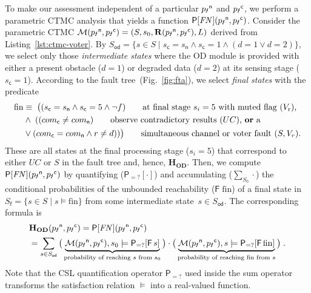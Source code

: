 \documentclass[runningheads,a4paper]{llncs}
\begin{document}
To make our assessment independent of a particular ${p_\text{\Lightning}}^\mathsf{n}$ and
${p_\text{\Lightning}}^\mathsf{c}$, we perform a parametric CTMC analysis that yields a
function $\mathsf{P}[\mathit{FN}]({p_\text{\Lightning}}^\mathsf{n},{p_\text{\Lightning}}^\mathsf{c})$.
Consider the parametric CTMC
$\mathcal{M}({p_\text{\Lightning}}^\mathsf{n},{p_\text{\Lightning}}^\mathsf{c}) =
(S,s_0,\mathbf{R}({p_\text{\Lightning}}^\mathsf{n},{p_\text{\Lightning}}^\mathsf{c}),L)$ derived from
Listing~\ref{lst:ctmc-voter}.
By
$S_{\mathsf{od}}=\{s\in S\mid s_{\mathsf{c}}=s_{\mathsf{n}} \land
s_{\mathsf{c}}=1 \land (d=1\lor d=2)\}$, we select only those
\emph{intermediate states} where the OD module is provided with either
a present obstacle ($d=1$) or degraded data ($d=2$) at its sensing
stage ($s_{\mathsf{c}}=1$).  According to the fault
tree~(Fig.~\ref{fig:fta}), we select \emph{final states} with the
predicate
\begin{align*}
  \mathrm{fin} &\equiv\; \big((s_{\mathsf{c}}=s_{\mathsf{n}} \land s_{\mathsf{c}}=5 \land\neg f)
    \tag*{at final stage $s_i=5$ with muted flag ($V_{\mathrm{r}}$),}
  \\&\land\; ((com_{\mathsf{c}}\neq com_{\mathsf{n}})
  \tag*{observe contradictory results ($UC$), \textbf{or} a}
  \\&\lor
  (com_{\mathsf{c}}=com_{\mathsf{n}}\land r \neq d))
  \big)
  \tag*{simultaneous channel or voter fault ($S,V_r$).}
\end{align*}
These are all states at the final processing stage ($s_i=5$) that
correspond to either $\mathit{UC}$ or $S$ in the fault tree and,
hence, $\mathbf{H}_\mathbf{OD}$.
Then, we compute $\mathsf{P}[\mathit{FN}]({p_\text{\Lightning}}^\mathsf{n},{p_\text{\Lightning}}^\mathsf{c})$ by
quantifying ($\mathsf{P}_{=?}[\cdot]$) and accumulating
($\sum_{S_0}\cdot$) the conditional probabilities of the unbounded
reachability ($\mathsf{F}\;\mathrm{fin}$) of a final state in
$S_{\mathsf{f}}=\{s\in S\mid s\models\mathrm{fin}\}$ from some
intermediate state~$s\in S_{\mathsf{od}}$.  The corresponding formula is
\begin{align}
  \label{eq:prob-fail-on-dem}
  &\mathbf{H}_\mathbf{OD}({p_\text{\Lightning}}^\mathsf{n},{p_\text{\Lightning}}^\mathsf{c})
  = \mathsf{P}[\mathit{FN}]({p_\text{\Lightning}}^\mathsf{n},{p_\text{\Lightning}}^\mathsf{c})
  \\&= \sum_{s\in S_{\mathsf{od}}}
  \big(\underbrace{
  \mathcal{M}({p_\text{\Lightning}}^\mathsf{n},{p_\text{\Lightning}}^\mathsf{c}),s_0\models\mathsf{P}_{=?}[\mathsf{F}\,s]
  }_{\text{probability of reaching $s$ from $s_0$}}\big)
  \cdot
  \big(\underbrace{\mathcal{M}({p_\text{\Lightning}}^\mathsf{n},{p_\text{\Lightning}}^\mathsf{c}),s
  \models \mathsf{P}_{=?} [ \mathsf{F}\,\mathrm{fin}
  ]}_{\text{probability of reaching $\mathrm{fin}$ from $s$}}\big)\;.
  \notag
\end{align}
Note that the CSL quantification operator $\mathsf{P}_{=?}$ used
inside the sum operator transforms the satisfaction relation $\models$
into a real-valued function.
\end{document}
